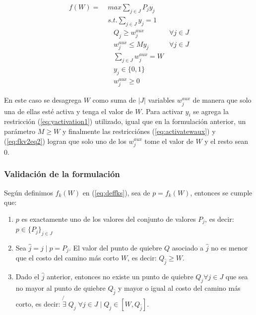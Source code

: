\documentclass{article}
\begin{document}
  \begin{align}
    f(W) =\; & max \sum_{j \in J} P_j y_j             & \label{eq:fkv2eq1}\\
             & s.t. \sum_{j \in J} y_j = 1            & \label{eq:fkv2eq2}\\
             & \;\;\; Q_j \geq w^{aux}_j              & \forall j \in J \label{eq:implfkoriginalineq} \\
             & \;\;\; w^{aux}_j \leq M y_j            & \forall j \in J \label{eq:yactivation1} \\
             & \;\;\; \sum_{j \in J} w^{aux}_j = W    & \label{eq:activatewaux} \\
             & \;\;\; y_j \in \{0,1\}                 & \label{eq:fkv2domainy} \\
             & \;\;\; w^{aux}_j \geq 0                & \label{eq:fkv2eq6}
  \end{align}

  En este caso se desagrega $W$ como suma de $|J|$ variables $w^{aux}_j$ de manera que solo una de ellas esté activa y tenga el valor de $W$. Para activar $y_i$ se agrega la restricción (\ref{eq:yactivation1}) utilizado, igual que en la formulación anterior, un parámetro $M \geq W$ y finalmente las restricciónes (\ref{eq:activatewaux}) y (\ref{eq:fkv2eq2}) logran que solo uno de los $w^{aux}_j$ tome el valor de $W$ y el resto sean 0.

  \subsubsection*{Validación de la formulación}

  Según definimos $f_k(W)$ en (\ref{eq:deffks}), sea de $p = f_k(W)$, entonces se cumple que:

  \begin{enumerate}
    \item {\label{deffpt1} $p$ es exactamente uno de los valores del conjunto de valores $P_j$, es decir: $p \in \{P_j\}_{j \in J}$}
    \item {\label{deffpt2} Sea $\hat{j} = j \;|\; p = P_j$. El valor del punto de quiebre $Q$ asociado a $\hat{j}$ no es menor que el costo del camino más corto $W$, es decir: $Q_{\hat{j}} \geq W$.}
    \item {\label{deffpt3} Dado el $\hat{j}$ anterior, entonces no existe un punto de quiebre $Q_j \forall j \in J$ que sea no mayor al punto de quiebre $Q_{\hat{j}}$ y mayor o igual al costo del camino más corto, es decir: $\not{\exists}\; Q_j\; \forall j \in J \;|\; Q_j \in  [W, Q_{\hat{j}}]$}.
  \end{enumerate}
\end{document}
